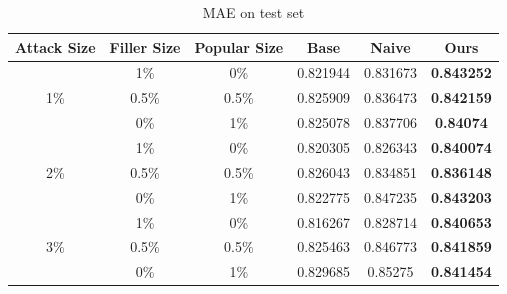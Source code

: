 \documentclass[master,english,final]{kaist-ucs}
\begin{document}
\begin{table}[h]
\caption{MAE on test set}
\label{resultMAE}
\begin{center}
\begin{tabular}{|c|c|c|c|c|c|}
\hline
\textbf{Attack Size} & \textbf{Filler Size} & \textbf{Popular Size} & \textbf{Base} & \textbf{Naive} & \textbf{Ours}     \\ \hline
\multirow{3}{*}{1\%} & 1\%                  & 0\%                   & 0.821944      & 0.831673       & \textbf{0.843252} \\ \cline{2-6}
                     & 0.5\%               & 0.5\%                & 0.825909      & 0.836473       & \textbf{0.842159} \\ \cline{2-6}
                     & 0\%                  & 1\%                   & 0.825078      & 0.837706       & \textbf{0.84074}  \\ \hline
\multirow{3}{*}{2\%} & 1\%                  & 0\%                   & 0.820305      & 0.826343       & \textbf{0.840074} \\ \cline{2-6}
                     & 0.5\%               & 0.5\%                & 0.826043      & 0.834851       & \textbf{0.836148} \\ \cline{2-6}
                     & 0\%                  & 1\%                   & 0.822775      & 0.847235       & \textbf{0.843203} \\ \hline
\multirow{3}{*}{3\%} & 1\%                  & 0\%                   & 0.816267      & 0.828714       & \textbf{0.840653} \\ \cline{2-6}
                     & 0.5\%               & 0.5\%                & 0.825463      & 0.846773       & \textbf{0.841859} \\ \cline{2-6}
                     & 0\%                  & 1\%                   & 0.829685      & 0.85275        & \textbf{0.841454} \\ \hline
\end{tabular}
\end{center}
\end{table}
\end{document}

